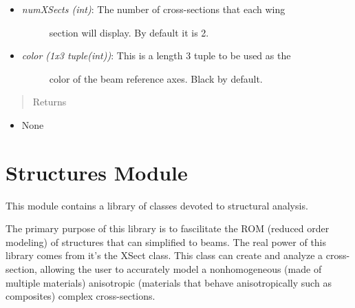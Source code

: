 \documentclass[letterpaper,10pt,english]{sphinxmanual}
\begin{document}
\begin{fulllineitems}
\begin{fulllineitems}
\begin{itemize}
\begin{description}
\end{description}

\item {} \begin{description}
\item[{\emph{numXSects (int)}: The number of cross-sections that each wing}] \leavevmode
section will display. By default it is 2.

\end{description}

\item {} \begin{description}
\item[{\emph{color (1x3 tuple(int))}: This is a length 3 tuple to be used as the}] \leavevmode
color of the beam reference axes. Black by default.

\end{description}

\end{itemize}
\begin{quote}\begin{description}
\item[{Returns}] \leavevmode
\end{description}\end{quote}
\begin{itemize}
\item {} 
None

\end{itemize}

\end{fulllineitems}


\end{fulllineitems}



\section{Structures Module}
\label{structures::doc}\label{structures:structures-module}\label{structures:module-AeroComBAT.Structures}
This module contains a library of classes devoted to structural analysis.

The primary purpose of this library is to fascilitate the ROM (reduced order
modeling) of structures that can simplified to beams. The real power of this
library comes from it's the XSect class. This class can create and analyze
a cross-section, allowing the user to accurately model a nonhomogeneous
(made of multiple materials) anisotropic (materials that behave anisotropically
such as composites) complex cross-sections.
\end{document}
